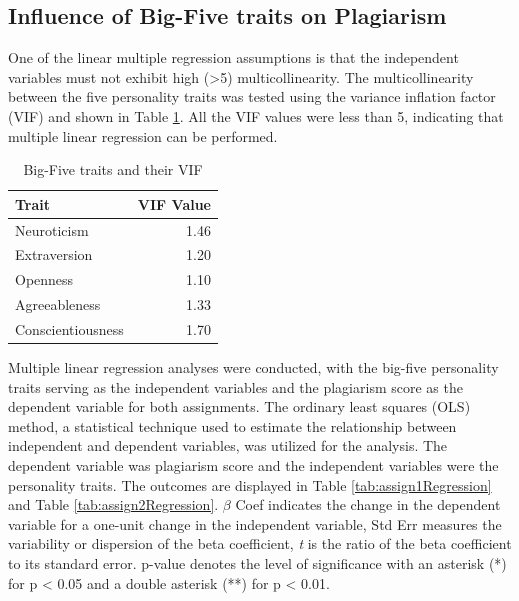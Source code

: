 \subsection{Influence of Big-Five traits on Plagiarism}

One of the linear multiple regression assumptions is that the independent variables must not exhibit high (>5) multicollinearity. The multicollinearity between the five personality traits was tested using the variance inflation factor (VIF) and shown in Table \ref{tab:VIF}. All the VIF values were less than 5, indicating that multiple linear regression can be performed. 

\begin{table}[h]
  \centering
  \caption{Big-Five traits and their VIF\label{tab:VIF}}
    \vspace{-12pt}
  \begin{tabular}{p{2cm}r}
    \toprule
    Trait & VIF Value \\\midrule
    Neuroticism & 1.46 \\
    Extraversion & 1.20 \\
    Openness & 1.10\\
    Agreeableness & 1.33 \\ 
    Conscientiousness & 1.70  \\\bottomrule
  \end{tabular}\vspace{-4pt}
\end{table}

Multiple linear regression analyses were conducted, with the big-five personality traits serving as the independent variables and the plagiarism score as the dependent variable for both assignments. The ordinary least squares (OLS) method, a statistical technique used to estimate the relationship between independent and dependent variables, was utilized for the analysis. The dependent variable was plagiarism score and the independent variables were the personality traits. The outcomes are displayed in Table \ref{tab:assign1Regression} and Table \ref{tab:assign2Regression}. $\beta$ Coef indicates the change in the dependent variable for a one-unit change in the independent variable, Std Err measures the variability or dispersion of the beta coefficient, \textit{t} is the ratio of the beta coefficient to its standard error. p-value denotes the level of significance with an asterisk (*) for p < 0.05 and a double asterisk (**) for p < 0.01.

